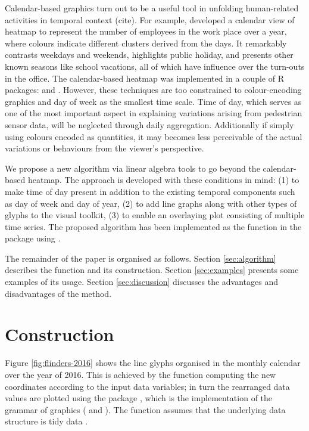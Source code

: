 \documentclass[article]{jss}
\begin{document}
Calendar-based graphics turn out to be a useful tool in unfolding
human-related activities in temporal context (cite). For example,
\citet{VanWijkCluster1999} developed a calendar view of heatmap to
represent the number of employees in the work place over a year, where
colours indicate different clusters derived from the days. It remarkably
contrasts weekdays and weekends, highlights public holiday, and presents
other known seasons like school vacations, all of which have influence
over the turn-outs in the office. The calendar-based heatmap was
implemented in a couple of R packages: 
\citep{R-ggTimeSeries} and  \citep{R-ggcal}. However, these
techniques are too constrained to colour-encoding graphics and day of
week as the smallest time scale. Time of day, which serves as one of the
most important aspect in explaining variations arising from pedestrian
sensor data, will be neglected through daily aggregation. Additionally
if simply using colours encoded as quantities, it may becomes less
perceivable of the actual variations or behaviours from the viewer's
perspective.

We propose a new algorithm via linear algebra tools to go beyond the
calendar-based heatmap. The approach is developed with these conditions
in mind: (1) to make time of day present in addition to the existing
temporal components such as day of week and day of year, (2) to add line
graphs along with other types of glyphs to the visual toolkit, (3) to
enable an overlaying plot consisting of multiple time series. The
proposed algorithm has been implemented as the 
function in the  package \citep{R-sugrrants} using
 \citep{R-base}.

The remainder of the paper is organised as follows. Section
\ref{sec:algorithm} describes the  function and its
construction. Section \ref{sec:examples} presents some examples of its
usage. Section \ref{sec:discussion} discusses the advantages and
disadvantages of the method.

\section{Construction}\label{construction}

\label{sec:algorithm}

Figure \ref{fig:flinders-2016} shows the line glyphs organised in the
monthly calendar over the year of 2016. This is achieved by the
 function computing the new coordinates according
to the input data variables; in turn the rearranged data values are
plotted using the  package \citep{R-ggplot2}, which is the
implementation of the grammar of graphics (\citet{wilkinson2006grammar}
and \citet{wickham2010layered}). The  function
assumes that the underlying data structure is tidy data
\citep{wickham2014tidy}.
\end{document}
